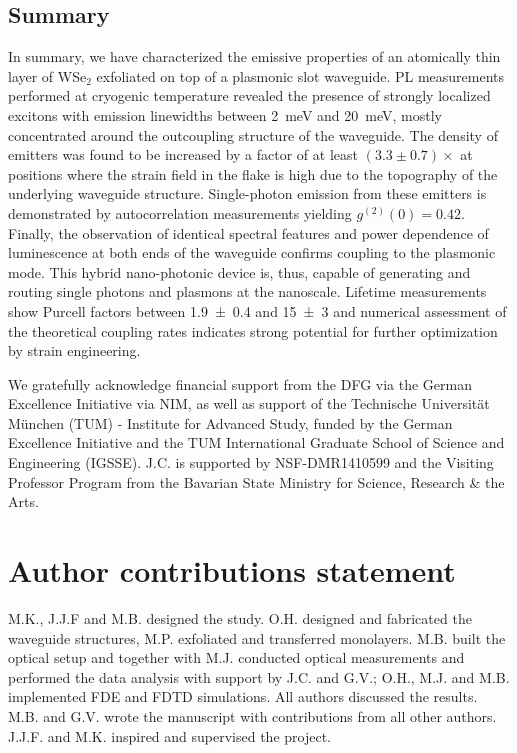 \documentclass[journal=nalefd,manuscript=letter]{achemso}
\begin{document}
\subsection{Summary}
In summary, we have characterized the emissive properties of an atomically thin layer of WSe$_2$ exfoliated on top of a plasmonic slot waveguide.
PL measurements performed at cryogenic temperature revealed the presence of strongly localized excitons with emission linewidths between \SI{2}{\milli\electronvolt} and \SI{20}{\milli\electronvolt}, mostly concentrated around the outcoupling structure of the waveguide.
The density of emitters was found to be increased by a factor of at least $(3.3 \pm 0.7) \times$ at positions where the strain field in the flake is high due to the topography of the underlying waveguide structure.
Single-photon emission from these emitters is demonstrated by autocorrelation measurements yielding $g^{(2)}(0) = 0.42$.
Finally, the observation of identical spectral features and power dependence of luminescence at both ends of the waveguide confirms coupling to the plasmonic mode.
This hybrid nano-photonic device is, thus, capable of generating and routing single photons and plasmons at the nanoscale.
Lifetime measurements show Purcell factors between \SI{1.9 \pm 0.4}{} and \SI{15 \pm 3}{} and numerical assessment of the theoretical coupling rates indicates strong potential for further optimization by strain engineering.

\begin{acknowledgement}
We gratefully acknowledge financial support from the DFG via the German Excellence Initiative via NIM, as well as support of the Technische Universit\"at M\"unchen (TUM) - Institute for Advanced Study, funded by the German Excellence Initiative and the TUM International Graduate School of Science and Engineering (IGSSE).
J.C. is supported by NSF-DMR1410599 and the Visiting Professor Program from the Bavarian State Ministry for Science, Research \& the Arts.
\end{acknowledgement}

\section{Author contributions statement}
M.K., J.J.F and M.B. designed the study. O.H. designed and fabricated the waveguide structures, M.P. exfoliated and transferred monolayers. M.B. built the optical setup and together with M.J. conducted optical measurements and performed the data analysis with support by J.C. and G.V.; O.H., M.J. and M.B. implemented FDE and FDTD simulations.
All authors discussed the results. M.B. and G.V. wrote the manuscript with contributions from all other authors.
J.J.F. and M.K. inspired and supervised the project.


\end{document}
